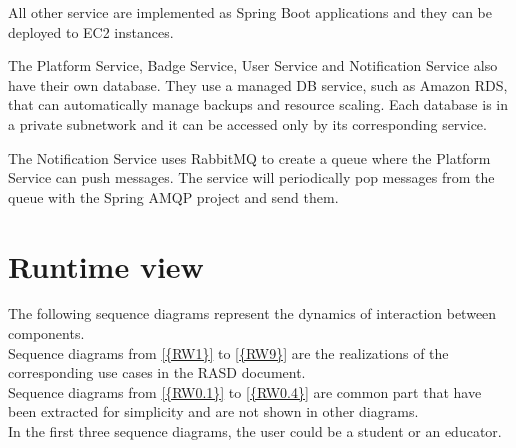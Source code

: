 All other service are implemented as Spring Boot \cite{SpringBoot} applications and they can be deployed to EC2 instances.

The Platform Service, Badge Service, User Service and Notification Service also have their own database.
They use a managed DB service, such as Amazon RDS, that can automatically manage backups and resource scaling.
Each database is in a private subnetwork and it can be accessed only by its corresponding service.

The Notification Service uses RabbitMQ \cite{RabbitMQ} to create a queue where the Platform Service can push messages.
The service will periodically pop messages from the queue with the Spring AMQP project \cite{SpringAMQP} and send them.

\pagebreak

\section{Runtime view}
The following sequence diagrams represent the dynamics of interaction between components.\\
Sequence diagrams from \ref{{RW1}} to \ref{{RW9}} are the realizations of the corresponding use cases in the RASD document.\\
Sequence diagrams from \ref{{RW0.1}} to \ref{{RW0.4}} are common part that have been extracted for simplicity and are not shown in other diagrams.\\
In the first three sequence diagrams, the user could be a student or an educator.

